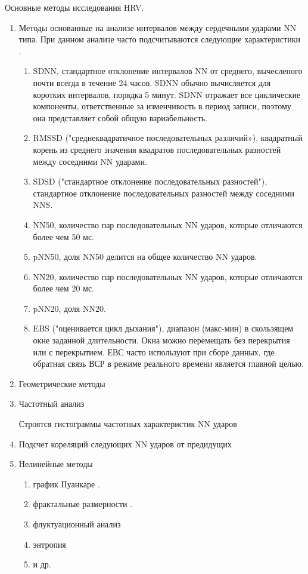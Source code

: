 Основные методы исследования HRV.

\begin{enumerate}
	\item Методы основанные на анализе интервалов между сердечными ударами NN типа. При данном анализе часто подсчитываются следующие характеристики \cite{pNN, metric_of_hrv}.
	\begin{enumerate}
		\item SDNN, стандартное отклонение интервалов NN от среднего, вычесленого почти всегда в течение 24 часов. SDNN обычно вычисляется для коротких интервалов, порядка 5 минут. SDNN отражает все циклические компоненты, ответственные за изменчивость в период записи, поэтому она представляет собой общую вариабельность.
		\item 	RMSSD ("среднеквадратичное последовательных различий»), квадратный корень из среднего значения квадратов последовательных разностей между соседними NN ударами.
		\item SDSD ("стандартное отклонение последовательных разностей"), стандартное отклонение последовательных разностей между соседними NNS.
		\item NN50, количество пар последовательных NN ударов, которые отличаются более чем 50 мс.
		\item pNN50, доля NN50 делится на общее количество NN ударов.
		\item 	NN20, количество пар последовательных NN ударов, которые отличаются более чем 20 мс.
		\item pNN20, доля NN20.
		\item EBS ("оценивается цикл дыхания"), диапазон (макс-мин) в скользящем окне заданной длительности. Окна можно перемещать без перекрытия или с перекрытием. ЕВС часто используют при сборе данных, где обратная связь ВСР в режиме реального времени является главной целью.
	\end{enumerate}
	\item Геометрические методы \cite{geometric_metric}
	\item Частотный анализ
	
	Строятся гистограммы частотных характеристик NN ударов
	
	\item Подсчет кореляций следующих NN ударов от предидущих \cite{autocorr_metric}
	\item Нелинейные методы \cite{non_linear_metric}
	
	\begin{enumerate}
		\item график Пуанкаре \cite{poinkare_plot}.
		\item фрактальные размерности \cite{fractal_dim}.
		\item флуктуационный анализ \cite{fluct_analis}
		\item энтропия \cite{entropy1, entropy2, entropy3}
		\item и др. \cite{other_analis1, other_analis2, other_analis3}
	\end{enumerate}	
\end{enumerate}

